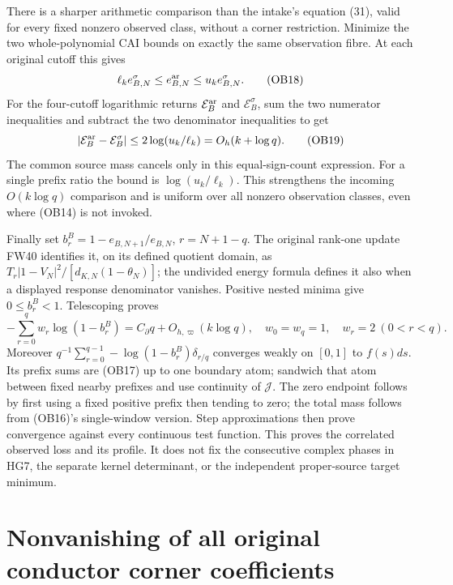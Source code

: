 There is a sharper arithmetic comparison than the intake's equation
(31), valid for every fixed nonzero observed class, without a corner
restriction. Minimize the two whole-polynomial CAI bounds on exactly
the same observation fibre. At each original cutoff this gives
\[
 \ell_ke_{B,N}^\sigma\le e_{B,N}^{\rm ar}\le u_ke_{B,N}^\sigma.
 \tag{OB18}
\]
For the four-cutoff logarithmic returns $\mathcal E_B^{\rm ar}$ and
$\mathcal E_B^\sigma$, sum the two numerator inequalities and subtract
the two denominator inequalities to get
\[
 |\mathcal E_B^{\rm ar}-\mathcal E_B^\sigma|
 \le2\log(u_k/\ell_k)=O_h(k+\log q).\tag{OB19}
\]
The common source mass cancels only in this equal-sign-count expression.
For a single prefix ratio the bound is $\log(u_k/\ell_k)$. This
strengthens the incoming $O(k\log q)$ comparison and is uniform over
all nonzero observation classes, even where (OB14) is not invoked.

Finally set $b_r^B=1-e_{B,N+1}/e_{B,N}$, $r=N+1-q$. The original
rank-one update FW40 identifies it, on its defined quotient domain, as
$T_r|1-V_N|^2/[d_{K,N}(1-\theta_N)]$; the undivided energy formula
defines it also when a displayed response denominator vanishes.
Positive nested minima give $0\le b_r^B<1$. Telescoping proves
\[
 -\sum_{r=0}^{q}w_r\log(1-b_r^B)
 =C_\partial q+O_{h,\varpi}(k\log q),\quad
 w_0=w_q=1,\quad w_r=2\ (0<r<q).\tag{OB20}
\]
Moreover $q^{-1}\sum_{r=0}^{q-1}-\log(1-b_r^B)\delta_{r/q}$
converges weakly on $[0,1]$ to $f(s)ds$. Its prefix sums are (OB17)
up to one boundary atom; sandwich that atom between fixed nearby
prefixes and use continuity of $\mathcal J$. The zero endpoint follows
by first using a fixed positive prefix then tending to zero; the total
mass follows from (OB16)'s single-window version. Step approximations
then prove convergence against every continuous test function.
This proves the correlated observed loss and its profile. It does not
fix the consecutive complex phases in HG7, the separate kernel
determinant, or the independent proper-source target minimum.

\section{Nonvanishing of all original conductor corner coefficients}
\label{hzoc:sec:OC-original-corners}

